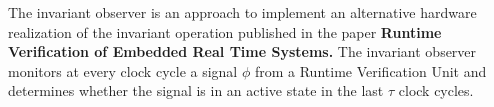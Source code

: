 


\begin{abstracts}        %

The invariant observer is an approach to implement an alternative hardware realization of the invariant operation
published in the paper \textbf{Runtime Verification of Embedded Real Time Systems.}
The invariant observer monitors at every clock cycle a signal $\phi$ from a Runtime Verification Unit and 
determines whether the signal is in an active state in the last $\tau$ clock cycles.


\end{abstracts}




